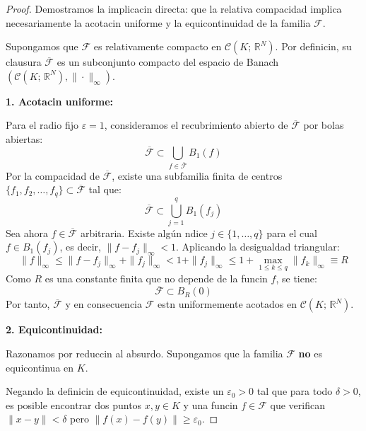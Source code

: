 \begin{proof}
    Demostramos la implicacin directa: que la relativa compacidad implica necesariamente la acotacin uniforme y la equicontinuidad de la familia $\mathcal{F}$.

    Supongamos que $\mathcal{F}$ es relativamente compacto en $\mathcal{C}(K; \, \mathbb{R}^N)$. Por definicin, su clausura $\overline{\mathcal{F}}$ es un subconjunto compacto del espacio de Banach $(\mathcal{C}(K; \, \mathbb{R}^N), \|\cdot\|_\infty)$.

    \medskip

    \textbf{1. Acotacin uniforme:}

    Para el radio fijo $\varepsilon = 1$, consideramos el recubrimiento abierto de $\overline{\mathcal{F}}$ por bolas abiertas:
    \[
        \overline{\mathcal{F}} \subset \bigcup_{f \in \overline{\mathcal{F}}} B_1(f)
    \]
    Por la compacidad de $\overline{\mathcal{F}}$, existe una subfamilia finita de centros $\{f_1, f_2, \dots, f_q\} \subset \overline{\mathcal{F}}$ tal que:
    \[
        \overline{\mathcal{F}} \subset \bigcup_{j=1}^q B_1(f_j)
    \]
    Sea ahora $f \in \overline{\mathcal{F}}$ arbitraria. Existe algún ndice $j \in \{1, \dots, q\}$ para el cual $f \in B_1(f_j)$, es decir, $\|f - f_j\|_\infty < 1$. Aplicando la desigualdad triangular:
    \[
        \|f\|_\infty \leq \|f - f_j\|_\infty + \|f_j\|_\infty < 1 + \|f_j\|_\infty \leq 1 + \max_{1 \leq k \leq q} \|f_k\|_\infty \equiv R
    \]
    Como $R$ es una constante finita que no depende de la funcin $f$, se tiene:
    \[
        \overline{\mathcal{F}} \subset B_R(0)
    \]
    Por tanto, $\overline{\mathcal{F}}$ y en consecuencia $\mathcal{F}$ estn uniformemente acotados en $\mathcal{C}(K; \, \mathbb{R}^N)$.

    \medskip

    \textbf{2. Equicontinuidad:}

    Razonamos por reduccin al absurdo. Supongamos que la familia $\mathcal{F}$ \textbf{no} es equicontinua en $K$. 

    Negando la definicin de equicontinuidad, existe un $\varepsilon_0 > 0$ tal que para todo $\delta > 0$, es posible encontrar dos puntos $x, y \in K$ y una funcin $f \in \mathcal{F}$ que verifican $\|x - y\| < \delta$ pero $\|f(x) - f(y)\| \geq \varepsilon_0$.


\end{proof}
